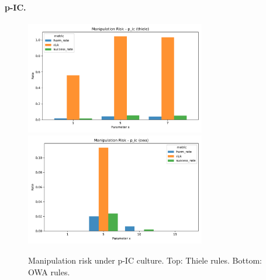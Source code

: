 \documentclass[11pt]{article}
\begin{document}
\paragraph{p-IC.}
\begin{figure}[h!]
\centering
\includegraphics[width=0.7\textwidth]{figures/risk_p_ic_thiele.pdf}
\includegraphics[width=0.7\textwidth]{figures/risk_p_ic_owa.pdf}
\caption{Manipulation risk under p-IC culture. Top: Thiele rules. Bottom: OWA rules.}
\end{figure}
\end{document}
